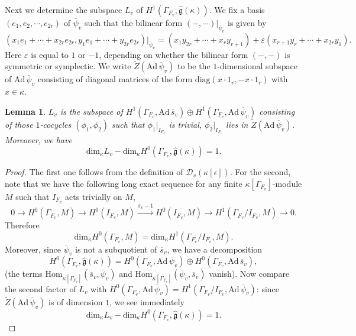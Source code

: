 \documentclass[12pt,oneside,reqno]{amsart}
\theoremstyle{plain}
\newtheorem{lemma}[theorem]{Lemma}
\begin{document}
	
	Next we determine
	the subspace
	$L_v$
	of
	$H^1(\Gamma_{F_v},\widehat{\mathfrak{g}}(\kappa))$.
	We fix a basis
	$(e_1,e_2,\cdots,e_{2r})$
	of
	$\overline{\psi}_v$ such that
	the bilinear form $(-,-)|_{\overline{\psi}_v}$
	is given by
	\[
	(x_1e_1+\cdots+x_{2r}e_{2r},y_1e_1+\cdots+y_{2r}e_{2r})|_{\overline{\psi}_v}
	=
	(x_1y_{2r}+\cdots+x_ry_{r+1})+\varepsilon(x_{r+1}y_r+\cdots+x_{2r}y_1).
	\]
	Here $\varepsilon$ is equal to $1$ or $-1$, depending on whether the bilinear form $(-,-)$ is symmetric or symplectic. We write
	$\widetilde{Z}(\mathrm{Ad}\,\overline{\psi}_v)$
	to be the
	$1$-dimensional
	subspace of
	$\mathrm{Ad}\,\overline{\psi}_v$
	consisting of
	diagonal matrices of the form
	$\mathrm{diag}(x\cdot1_r,-x\cdot1_r)$
	with
	$x\in\kappa$.
	\begin{lemma}
		$L_v$
		is the subspace of
		$H^1(\Gamma_{F_v},\mathrm{Ad}\,\overline{s}_v)
		\oplus
		H^1(\Gamma_{F_v},\mathrm{Ad}\,\overline{\psi}_v)$
		consisting of those $1$-cocycles
		$(\phi_1,\phi_2)$
		such that
		$\phi_1|_{I_{F_v}}$
		is trivial,
		$\phi_2|_{I_{F_v}}$
		lies in
		$\widetilde{Z}(\mathrm{Ad}\,\overline{\psi}_v)$.
		Moreover,
		we have
		\[
		\mathrm{dim}_\kappa
		L_v
		-
		\mathrm{dim}_\kappa
		H^0(\Gamma_{F_v},\widehat{\mathfrak{g}}(\kappa))
		=
		1.
		\]
	\end{lemma}
	\begin{proof}
		The first one follows from the definition of
		$\mathcal{D}_v(\kappa[\epsilon])$.
		For the second,
		note that we have the following long exact sequence
		for any finite
		$\kappa[\Gamma_{F_v}]$-module $M$
		such that
		$I_{F_v}$
		acts trivially on $M$,
		\[
		0
		\rightarrow
		H^0(\Gamma_{F_v},
		M)
		\rightarrow
		H^0(I_{F_v},M)
		\xrightarrow{\sigma_v-1}
		H^0(I_{F_v},M)
		\rightarrow
		H^1(\Gamma_{F_v}/I_{F_v},
		M)
		\rightarrow
		0.
		\]
		Therefore
		\begin{equation}\label{comparison H0 and H1}
			\mathrm{dim}_\kappa
			H^0(\Gamma_{F_v},M)
			=
			\mathrm{dim}_\kappa
			H^1(\Gamma_{F_v}/I_{F_v},M).
		\end{equation}
		Moreover,
		since
		$\overline{\psi}_v$ is not a subquotient of
		$\overline{s}_v$,
		we have a decomposition
		\[
		H^0
		(\Gamma_{F_v},
		\widehat{\mathfrak{g}}(\kappa))
		=
		H^0(\Gamma_{F_v},\mathrm{Ad}\,\overline{\psi}_v)
		\oplus
		H^0(\Gamma_{F_v},\mathrm{Ad}\,\overline{s}_v),
		\]
		(the terms $\mathrm{Hom}_{\kappa[\Gamma_{F_v}]}
		(\overline{s}_v,\overline{\psi}_v)$ and
		$\mathrm{Hom}_{\kappa[\Gamma_{F_v}]}
		(\overline{\psi}_v,\overline{s}_v)$
		vanish).
		Now compare
		the second factor of
		$L_v$
		with
		$H^0(\Gamma_{F_v},\mathrm{Ad}\,\overline{\psi}_v)
		=
		H^1(\Gamma_{F_v}/I_{F_v},\mathrm{Ad}\,\overline{\psi}_v)$:
		since
		$\widetilde{Z}
		(\mathrm{Ad}\,\overline{\psi}_v)$
		is of dimension $1$,
		we see immediately
		\[
		\mathrm{dim}_\kappa L_v
		-
		\mathrm{dim}_\kappa
		H^0(\Gamma_{F_v},
		\widehat{\mathfrak{g}}(\kappa))
		=
		1.
		\]
		
	\end{proof}
	
\end{document}
